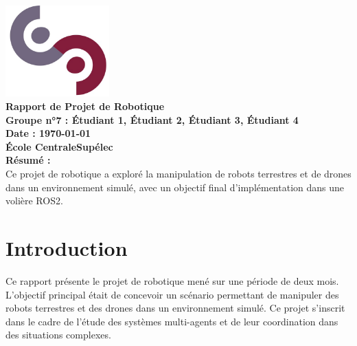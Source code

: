 \documentclass[a4paper,12pt]{article}
\renewcommand{\cftsecafterpnum}{\vspace{0.3em}} %
\renewcommand{\cftsubsecafterpnum}{\vspace{0.2em}} %
\begin{document}
\begin{titlepage}
\begin{center}
    \includegraphics[width=0.3\textwidth]{logo_cs.jpg}\\[1cm] %
    {\Huge\textbf{Rapport de Projet de Robotique}}\\[0.5cm]
    \textbf{Groupe n°7 : Étudiant 1, Étudiant 2, Étudiant 3, Étudiant 4}\\[1cm]
    \textbf{Date : \today}\\[1cm]
    \textbf{École CentraleSupélec}\\[1cm]
    \vfill
    \textbf{Résumé :}\\[0.5cm]
    Ce projet de robotique a exploré la manipulation de robots terrestres et de drones dans un environnement simulé, avec un objectif final d'implémentation dans une volière ROS2.\\[1cm]
    \vfill
\end{center}
\end{titlepage}

\renewcommand{\cftsecfont}{\color{militarygreen}\bfseries}
\renewcommand{\cftsubsecfont}{\color{khaki}\bfseries}
\renewcommand{\cftsecafterpnum}{\vspace{-0.5em}} %
\renewcommand{\cftsubsecafterpnum}{\vspace{-0.5em}} %

\tableofcontents

\newpage

\section*{Introduction}
Ce rapport présente le projet de robotique mené sur une période de deux mois. L'objectif principal était de concevoir un scénario permettant de manipuler des robots terrestres et des drones dans un environnement simulé. Ce projet s'inscrit dans le cadre de l'étude des systèmes multi-agents et de leur coordination dans des situations complexes.
\end{document}
